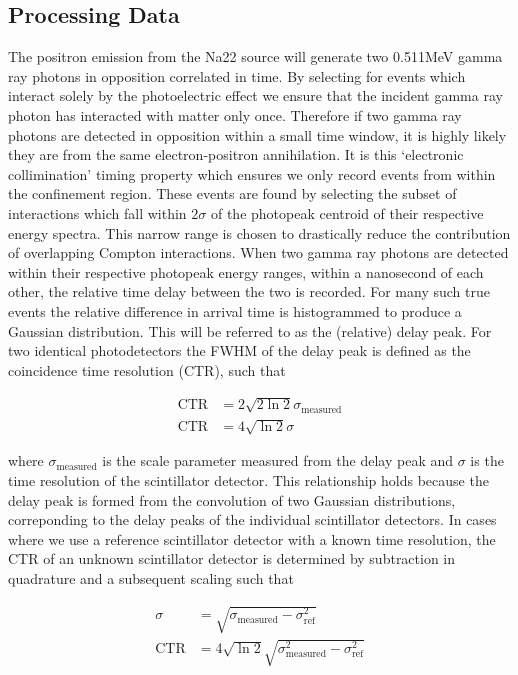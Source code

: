 \subsection{Processing Data}
The positron emission from the Na22 source will generate two 0.511MeV gamma ray photons in opposition correlated in time. By selecting for events which interact solely by the photoelectric effect we ensure that the incident gamma ray photon has interacted with matter only once. Therefore if two gamma ray photons are detected in opposition within a small time window, it is highly likely they are from the same electron-positron annihilation. It is this `electronic collimination' timing property which ensures we only record events from within the confinement region. These events are found by selecting the subset of interactions which fall within $2\sigma$ of the photopeak centroid of their respective energy spectra. This narrow range is chosen to drastically reduce the contribution of overlapping Compton interactions. When two gamma ray photons are detected within their respective photopeak energy ranges, within a nanosecond of each other, the relative time delay between the two is recorded. For many such true events the relative difference in  arrival time is histogrammed to produce a Gaussian distribution. This will be referred to as the (relative) delay peak. For two identical photodetectors the FWHM of the delay peak is defined as the coincidence time resolution (CTR), such that

\begin{align}
\text{CTR} &= 2\sqrt{2\ln{2}}\sigma_\text{measured}\\
\text{CTR} &= 4\sqrt{\ln{2}}\sigma
\label{eqn:ctrtoscale}
\end{align}

where $\sigma_\textrm{measured}$ is the scale parameter measured from the delay peak and $\sigma$ is the time resolution of the scintillator detector. This relationship holds because the delay peak is formed from the convolution of two Gaussian distributions, correponding to the delay peaks of the individual scintillator detectors. In cases where we use a reference scintillator detector with a known time resolution, the CTR of an unknown scintillator detector is determined by subtraction in quadrature and a subsequent scaling such that

\begin{align}
\sigma &= \sqrt{\sigma_\textrm{measured} - \sigma_\textrm{ref}^2}\\
\text{CTR} &= 4\sqrt{\ln{2}}\sqrt{\sigma_\textrm{measured}^2-\sigma_\textrm{ref}^2}
\end{align}

